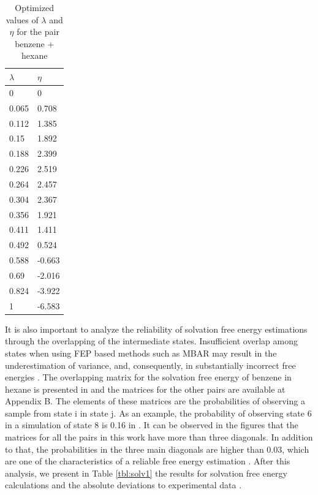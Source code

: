\begin{table}[h]
    \centering
    \caption{Optimized values of $\lambda$ and $\eta$ for the pair benzene + hexane}
      \label{tbl:lambdahex}
    \begin{tabular}{ll}
        \hline
        $\lambda$    &    $\eta$\\ 
        \hline        
        0    &    0\\ 
        0.065    &    0.708\\ 
        0.112    &    1.385\\ 
        0.15    &    1.892 \\ 
        0.188    &    2.399\\ 
        0.226    &    2.519\\ 
        0.264    &    2.457\\ 
        0.304    &    2.367\\ 
        0.356    &    1.921\\ 
        0.411    &    1.411\\ 
        0.492    &    0.524\\ 
        0.588    &    -0.663\\ 
        0.69    &    -2.016 \\ 
        0.824    &    -3.922\\ 
        1        &    -6.583\\     
        \hline
    \end{tabular}
\end{table}
\FloatBarrier
It is also important to analyze the reliability of solvation free energy estimations  through the overlapping of the intermediate states. Insufficient overlap among states when using FEP based methods such as MBAR may result in the underestimation of variance, and, consequently, in substantially incorrect free energies \cite{klimovich}. The overlapping matrix for the solvation free energy of benzene in hexane is presented in  and the matrices for the other pairs are available at Appendix B. The elements of these matrices are the probabilities of observing a sample from state  i in state j. As an example, the probability of observing state 6 in a simulation of state 8 is 0.16 in . It can be observed in the figures that  the matrices for all the pairs in this work have more than  three diagonals. In addition to that,  the probabilities in the three main diagonals are higher than 0.03, which are one of the characteristics of a reliable free energy estimation \cite{klimovich}. After this analysis, we present in Table \ref{tbl:solv1} the results for solvation free energy calculations and the absolute deviations to experimental data \cite{doi:10.1021/ci034120c}.   

